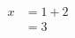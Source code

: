 $
      \begin{equation}
      \begin{alignedat}{1}
      x &= 1 + 2 \\
      &= 3     \\
      \end{alignedat}
      \end{equation}
$
